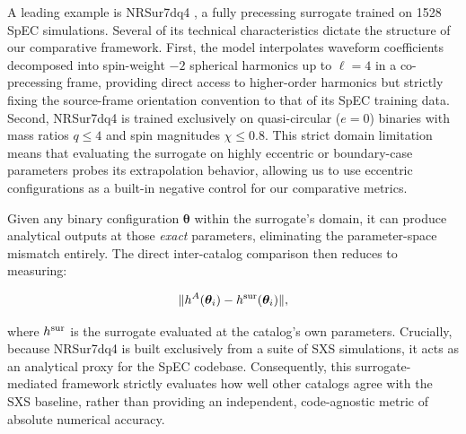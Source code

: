 \documentclass[%
 reprint,
superscriptaddress,
 amsmath,amssymb,
 aps,
]{revtex4-2}
\begin{document}
A leading example is NRSur7dq4 \cite{Varma:2019csw, Varma:2018aht}, a fully precessing surrogate trained on 1528 SpEC simulations. Several of its technical characteristics dictate the structure of our comparative framework. First, the model interpolates waveform coefficients decomposed into spin-weight $-2$ spherical harmonics up to $\ell=4$ in a co-precessing frame, providing direct access to higher-order harmonics but strictly fixing the source-frame orientation convention to that of its SpEC training data. Second, NRSur7dq4 is trained exclusively on quasi-circular ($e=0$) binaries with mass ratios $q \le 4$ and spin magnitudes $\chi \le 0.8$. This strict domain limitation means that evaluating the surrogate on highly eccentric or boundary-case parameters probes its extrapolation behavior, allowing us to use eccentric configurations as a built-in negative control for our comparative metrics. 

Given any binary configuration $\boldsymbol{\theta}$ within the surrogate's domain, it can produce analytical outputs at those \textit{exact} parameters, eliminating the parameter-space mismatch entirely. The direct inter-catalog comparison then reduces to measuring:

\begin{equation}\|h^A(\boldsymbol{\theta}_i) - h^{\rm sur}(\boldsymbol{\theta}_i)\|,\end{equation}

where $h^{\rm sur}$ is the surrogate evaluated at the catalog's own parameters. Crucially, because NRSur7dq4 is built exclusively from a suite of SXS simulations, it acts as an analytical proxy for the SpEC codebase. Consequently, this surrogate-mediated framework strictly evaluates how well other catalogs agree with the SXS baseline, rather than providing an independent, code-agnostic metric of absolute numerical accuracy.
\end{document}
